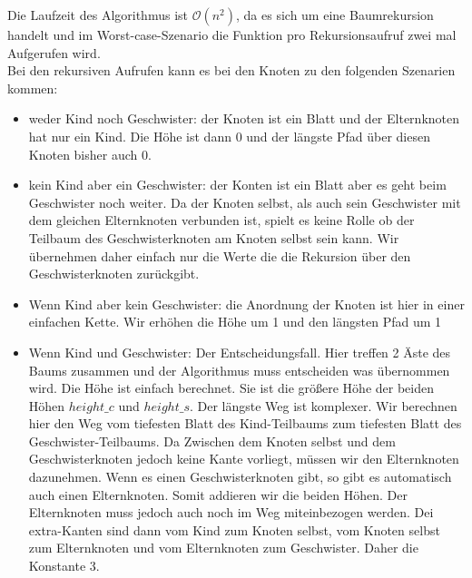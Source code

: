 \documentclass[a4paper]{article}
\begin{document}
Die Laufzeit des Algorithmus ist $\mathcal{O}(n^2)$, da es sich um eine Baumrekursion handelt und im Worst-case-Szenario die Funktion pro Rekursionsaufruf zwei mal Aufgerufen wird.\\

Bei den rekursiven Aufrufen kann es bei den Knoten zu den folgenden Szenarien kommen:

\begin{itemize}
    \item weder Kind noch Geschwister: der Knoten ist ein Blatt und der Elternknoten hat nur ein Kind. Die Höhe ist dann 0 und der längste Pfad über diesen Knoten bisher auch 0.
    \item kein Kind aber ein Geschwister: der Konten ist ein Blatt aber es geht beim Geschwister noch weiter. Da der Knoten selbst, als auch sein Geschwister mit dem gleichen Elternknoten verbunden ist, spielt es keine Rolle ob der Teilbaum des Geschwisterknoten am Knoten selbst sein kann. Wir übernehmen daher einfach nur die Werte die die Rekursion über den Geschwisterknoten zurückgibt.
    \item Wenn Kind aber kein Geschwister: die Anordnung der Knoten ist hier in einer einfachen Kette. Wir erhöhen die Höhe um 1 und den längsten Pfad um 1
    \item Wenn Kind und Geschwister: Der Entscheidungsfall. Hier treffen 2 Äste des Baums zusammen und der Algorithmus muss entscheiden was übernommen wird. Die Höhe ist einfach berechnet. Sie ist die größere Höhe der beiden Höhen $height\_c$ und $height\_s$. Der längste Weg ist komplexer. Wir berechnen hier den Weg vom tiefesten Blatt des Kind-Teilbaums zum tiefesten Blatt des Geschwister-Teilbaums. Da Zwischen dem Knoten selbst und dem Geschwisterknoten jedoch keine Kante vorliegt, müssen wir den Elternknoten dazunehmen. Wenn es einen Geschwisterknoten gibt, so gibt es automatisch auch einen Elternknoten. Somit addieren wir die beiden Höhen. Der Elternknoten muss jedoch auch noch im Weg miteinbezogen werden. Dei extra-Kanten sind dann vom Kind zum Knoten selbst, vom Knoten selbst zum Elternknoten und vom Elternknoten zum Geschwister. Daher die Konstante 3.
\end{itemize}




\break
\end{document}

